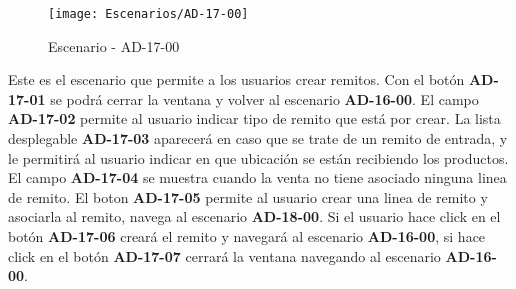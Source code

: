 \begin{figure}[H]
\centering
\texttt{[image: Escenarios/AD-17-00]}
\caption{Escenario - AD-17-00}
\label{fig:AD-17-00}
\end{figure}
Este es el escenario que permite a los usuarios crear remitos. Con el botón \textbf{AD-17-01} se podrá cerrar la ventana y volver al escenario \textbf{AD-16-00}.
El campo \textbf{AD-17-02} permite al usuario indicar tipo de remito que está por crear.  La lista desplegable \textbf{AD-17-03} aparecerá en caso que se trate de un remito de entrada, y le permitirá al usuario indicar en que ubicación se están recibiendo los productos.
El campo \textbf{AD-17-04} se muestra cuando la venta no tiene asociado ninguna linea de remito. El boton \textbf{AD-17-05} permite al usuario crear una linea de remito y asociarla al remito, navega al escenario \textbf{AD-18-00}. Si el usuario hace click en el botón \textbf{AD-17-06} creará el remito y navegará al escenario \textbf{AD-16-00}, si hace click en el botón \textbf{AD-17-07} cerrará la ventana navegando al escenario \textbf{AD-16-00}.
\\
